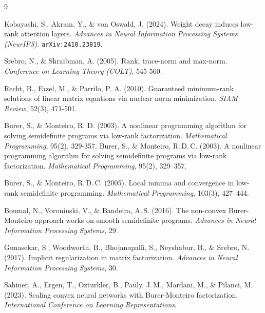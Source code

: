 
\begin{thebibliography}{9}

Kobayashi, S., Akram, Y., \& von Oswald, J. (2024). Weight decay induces low-rank attention layers. \textit{Advances in Neural Information Processing Systems (NeurIPS)}. \texttt{arXiv:2410.23819}.

Srebro, N., \& Shraibman, A. (2005). Rank, trace-norm and max-norm. \textit{Conference on Learning Theory (COLT)}, 545-560.

Recht, B., Fazel, M., \& Parrilo, P. A. (2010). Guaranteed minimum-rank solutions of linear matrix equations via nuclear norm minimization. \textit{SIAM Review}, 52(3), 471-501.


Burer, S., \& Monteiro, R. D. (2003). A nonlinear programming algorithm for solving semidefinite programs via low-rank factorization. \textit{Mathematical Programming}, 95(2), 329-357.
  Burer, S., \& Monteiro, R.\,D.\,C. (2003).
  A nonlinear programming algorithm for solving semidefinite programs via low-rank
  factorization.
  \emph{Mathematical Programming}, 95(2), 329--357.

  Burer, S., \& Monteiro, R.\,D.\,C. (2005).
  Local minima and convergence in low-rank semidefinite programming.
  \emph{Mathematical Programming}, 103(3), 427--444.

  Boumal, N., Voroninski, V., \& Bandeira, A.\,S. (2016).
  The non-convex Burer-Monteiro approach works on smooth semidefinite programs.
  \emph{Advances in Neural Information Processing Systems}, 29.

  Gunasekar, S., Woodworth, B., Bhojanapalli, S., Neyshabur, B., \& Srebro, N. (2017).
  Implicit regularization in matrix factorization.
  \emph{Advances in Neural Information Processing Systems}, 30.

  Sahiner, A., Ergen, T., Ozturkler, B., Pauly, J.\,M., Mardani, M., \& Pilanci, M. (2023).
  Scaling convex neural networks with Burer-Monteiro factorization.
  \emph{International Conference on Learning Representations}.


\end{thebibliography}
